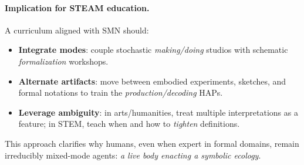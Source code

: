 \paragraph{Implication for STEAM education.}
A curriculum aligned with SMN should: 
\begin{itemize}
  \item \textbf{Integrate modes}: couple stochastic \emph{making/doing} studios with schematic \emph{formalization} workshops.
  \item \textbf{Alternate artifacts}: move between embodied experiments, sketches, and formal notations to train the \emph{production/decoding} HAPs.
  \item \textbf{Leverage ambiguity}: in arts/humanities, treat multiple interpretations as a feature; in STEM, teach when and how to \emph{tighten} definitions.
\end{itemize}
This approach clarifies why humans, even when expert in formal domains, remain irreducibly mixed-mode agents: \emph{a live body enacting a symbolic ecology}.
